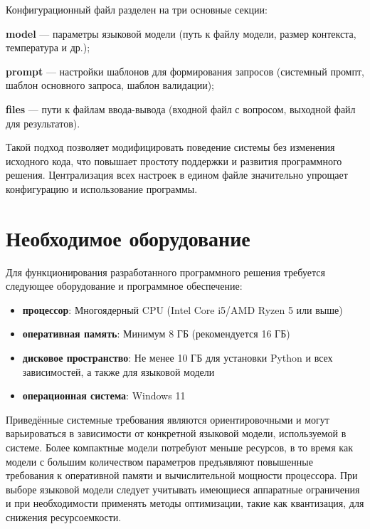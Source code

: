 Конфигурационный файл разделен на три основные секции:

\begin{enumdescript}
	\item \textbf{model} — параметры языковой модели (путь к файлу модели, размер контекста, температура и др.);
	\item \textbf{prompt} — настройки шаблонов для формирования запросов (системный промпт, шаблон основного запроса, шаблон валидации);
	\item \textbf{files} — пути к файлам ввода-вывода (входной файл с вопросом, выходной файл для результатов).
\end{enumdescript}

Такой подход позволяет модифицировать поведение системы без изменения исходного кода, что повышает простоту поддержки и развития программного решения. Централизация всех настроек в едином файле значительно упрощает конфигурацию и использование программы.

\section{Необходимое оборудование}

Для функционирования разработанного программного решения требуется следующее оборудование и программное обеспечение:

\begin{itemize}
	\item \textbf{процессор}: Многоядерный CPU (Intel Core i5/AMD Ryzen 5 или выше)
	\item \textbf{оперативная память}: Минимум 8 ГБ (рекомендуется 16 ГБ)
	\item \textbf{дисковое пространство}: Не менее 10 ГБ для установки Python и всех зависимостей, а также для языковой модели
	\item \textbf{операционная система}: Windows 11
\end{itemize}

Приведённые системные требования являются ориентировочными и могут варьироваться в зависимости от конкретной языковой модели, используемой в системе. Более компактные модели потребуют меньше ресурсов, в то время как модели с большим количеством параметров предъявляют повышенные требования к оперативной памяти и вычислительной мощности процессора. При выборе языковой модели следует учитывать имеющиеся аппаратные ограничения и при необходимости применять методы оптимизации, такие как квантизация, для снижения ресурсоемкости.

